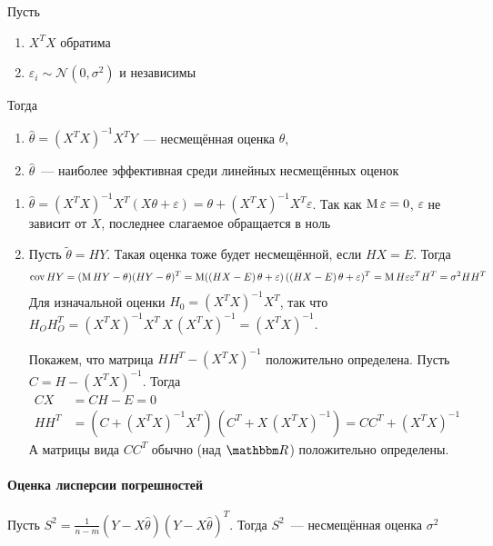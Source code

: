 \documentclass[12pt,timbord]{../../../notes}
\begin{document}
\begin{thrm}\label{thrm:stat::guasmark}
  Пусть 
  \begin{enumerate}
    \item $X^T X$ обратима
    \item $\varepsilon_i \sim \mathcal N(0,\sigma^2)$ и независимы
  \end{enumerate}
  Тогда 
  \begin{enumerate}
    \item $\hat \theta = (X^T X)^{-1} X^T Y$~--- несмещённая оценка $\theta$,
    \item $\hat\theta$~--- наиболее эффективная среди линейных несмещённых оценок
  \end{enumerate}
\end{thrm}
\begin{ittproof}
  \begin{enumerate}
    \item $\hat \theta = (X^TX)^{-1} X^T (X\theta + \varepsilon) = \theta + (X^TX)^{-1} X^T
      \varepsilon $. Так как $\operatorname{M} \varepsilon = 0$, $\varepsilon$ не зависит от $X$, последнее
      слагаемое обращается в ноль
    \item Пусть $\widetilde{\theta} = HY$. Такая оценка тоже будет несмещённой, если $HX = E$.
      Тогда\[
        \operatorname{cov} HY = (\operatorname{M} HY - \theta ) (HY - \theta )^T 
        = \operatorname{M} ( (HX-E)\, \theta + \varepsilon)\,( (HX-E)\, \theta + \varepsilon)^T
        = \operatorname{M} H \varepsilon \varepsilon^T H^T = \sigma^2 HH^T
      \]
      Для изначальной оценки $H_0 = (X^T X)^{-1}X^T$, так что 
      $H_OH_O^T =(X^T X)^{-1}X^T \, X \, (X^T X)^{-1} = (X^TX)^{-1}$.

      Покажем, что матрица $HH^T - (X^T X)^{-1} $ положительно определена. Пусть 
      $C = H - (X^T X)^{-1}$. Тогда 
      \begin{align*}
        CX &= CH - E = 0\\
        HH^T &= (C + (X^T X)^{-1} X^T)\, (C^T + X\,(X^T X)^{-1}) = CC^T + (X^TX)^{-1}
      \end{align*}
      А матрицы вида $CC^T$ обычно (над $\R$) положительно определены.
  \end{enumerate}
\end{ittproof}

\paragraph{Оценка лисперсии погрешностей}
\label{par:stat::estdispLSM}

\begin{thrm}\label{thrm:stat::estdispLSM::est}
  Пусть $\displaystyle S^2 = \frac{1}{n-m} (Y - X \hat \theta) ( Y - X \hat\theta)^T$. Тогда
  $S^2$~--- несмещённая оценка $\sigma^2$
\end{thrm}
\end{document}
